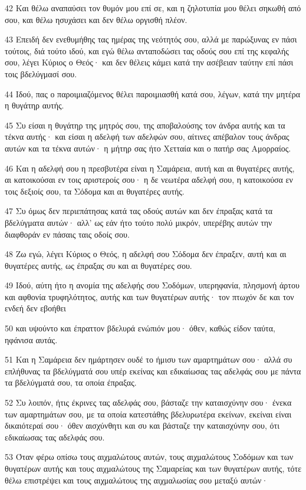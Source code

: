 \par 42 Και θέλω αναπαύσει τον θυμόν μου επί σε, και η ζηλοτυπία μου θέλει σηκωθή από σου, και θέλω ησυχάσει και δεν θέλω οργισθή πλέον.
\par 43 Επειδή δεν ενεθυμήθης τας ημέρας της νεότητός σου, αλλά με παρώξυνας εν πάσι τούτοις, διά τούτο ιδού, και εγώ θέλω ανταποδώσει τας οδούς σου επί της κεφαλής σου, λέγει Κύριος ο Θεός· και δεν θέλεις κάμει κατά την ασέβειαν ταύτην επί πάσι τοις βδελύγμασί σου.
\par 44 Ιδού, πας ο παροιμιαζόμενος θέλει παροιμιασθή κατά σου, λέγων, κατά την μητέρα η θυγάτηρ αυτής.
\par 45 Συ είσαι η θυγάτηρ της μητρός σου, της αποβαλούσης τον άνδρα αυτής και τα τέκνα αυτής· και είσαι η αδελφή των αδελφών σου, αίτινες απέβαλον τους άνδρας αυτών και τα τέκνα αυτών· η μήτηρ σας ήτο Χετταία και ο πατήρ σας Αμορραίος.
\par 46 Και η αδελφή σου η πρεσβυτέρα είναι η Σαμάρεια, αυτή και αι θυγατέρες αυτής, αι κατοικούσαι εν τοις αριστεροίς σου· η δε νεωτέρα αδελφή σου, η κατοικούσα εν τοις δεξιοίς σου, τα Σόδομα και αι θυγατέρες αυτής.
\par 47 Συ όμως δεν περιεπάτησας κατά τας οδούς αυτών και δεν έπραξας κατά τα βδελύγματα αυτών· αλλ' ως εάν ήτο τούτο πολύ μικρόν, υπερέβης αυτών την διαφθοράν εν πάσαις ταις οδοίς σου.
\par 48 Ζω εγώ, λέγει Κύριος ο Θεός, η αδελφή σου Σόδομα δεν έπραξεν, αυτή και αι θυγατέρες αυτής, ως έπραξας συ και αι θυγατέρες σου.
\par 49 Ιδού, αύτη ήτο η ανομία της αδελφής σου Σοδόμων, υπερηφανία, πλησμονή άρτου και αφθονία τρυφηλότητος, αυτής και των θυγατέρων αυτής· τον πτωχόν δε και τον ενδεή δεν εβοήθει
\par 50 και υψούντο και έπραττον βδελυρά ενώπιόν μου· όθεν, καθώς είδον ταύτα, ηφάνισα αυτάς.
\par 51 Και η Σαμάρεια δεν ημάρτησεν ουδέ το ήμισυ των αμαρτημάτων σου· αλλά συ επλήθυνας τα βδελύγματά σου υπέρ εκείνας και εδικαίωσας τας αδελφάς σου με πάντα τα βδελύγματά σου, τα οποία έπραξας.
\par 52 Συ λοιπόν, ήτις έκρινες τας αδελφάς σου, βάσταζε την καταισχύνην σου· ένεκα των αμαρτημάτων σου, με τα οποία κατεστάθης βδελυρωτέρα εκείνων, εκείναι είναι δικαιότεραί σου· όθεν αισχύνθητι και συ και βάσταζε την καταισχύνην σου, ότι εδικαίωσας τας αδελφάς σου.
\par 53 Όταν φέρω οπίσω τους αιχμαλώτους αυτών, τους αιχμαλώτους Σοδόμων και των θυγατέρων αυτής και τους αιχμαλώτους της Σαμαρείας και των θυγατέρων αυτής, τότε θέλω επιστρέψει και τους αιχμαλώτους της αιχμαλωσίας σου μεταξύ αυτών·

